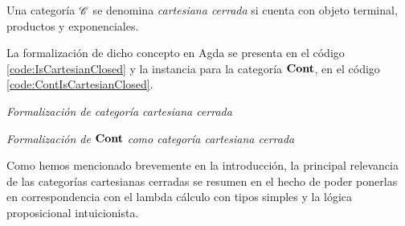 \begin{definition}
Una categoría $\mathscr{C}$ se denomina {\it cartesiana cerrada} si cuenta con objeto terminal, productos y exponenciales.
\end{definition}

La formalización de dicho concepto en Agda se presenta en el código \ref{code:IsCartesianClosed} y la instancia para la categoría $\mathbf{Cont}$, en el código \ref{code:ContIsCartesianClosed}.
\begin{agdacode}{\it Formalización de categoría cartesiana cerrada}\label{code:IsCartesianClosed}
  
\end{agdacode}
\begin{agdacode}{\it Formalización de $\mathbf{Cont}$ como categoría cartesiana cerrada}\label{code:ContIsCartesianClosed}
  
\end{agdacode}

Como hemos mencionado brevemente en la introducción, la principal relevancia de las categorías cartesianas cerradas se resumen en el hecho de poder ponerlas en correspondencia con el lambda cálculo con tipos simples y la lógica proposicional intuicionista.
